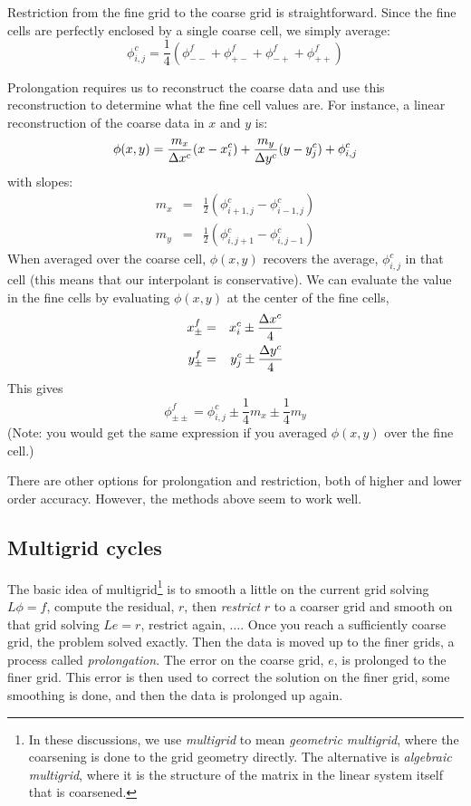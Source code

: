 Restriction from the fine grid to the coarse grid is straightforward.
Since the fine cells are perfectly enclosed by a single coarse cell,
we simply average:
\begin{equation}
\phi_{i,j}^c = \frac{1}{4} ( \phi_{--}^f + \phi_{+-}^f +
                             \phi_{-+}^f + \phi_{++}^f )
\end{equation}

Prolongation requires us to reconstruct the coarse data and use
this reconstruction to determine what the fine cell values are.  For
instance, a linear reconstruction of the coarse data in $x$ and $y$ is:
\begin{equation}
\phi(x,y) = \frac{m_x}{\Delta x^c} (x - x_i^c) + 
            \frac{m_y}{\Delta y^c} (y - y_j^c) + \phi_{i,j}^c
\end{equation}
with slopes:
\begin{eqnarray}
m_x &=& \frac{1}{2}({\phi_{i+1,j}^c - \phi_{i-1,j}^c}) \\
m_y &=& \frac{1}{2}({\phi_{i,j+1}^c - \phi_{i,j-1}^c})
\end{eqnarray}
%
When averaged over the coarse cell, $\phi(x,y)$ recovers the average,
$\phi_{i,j}^c$ in that cell (this means that our interpolant is
conservative).  We can evaluate the value in the fine cells by
evaluating $\phi(x,y)$ at the center of the fine cells,
\begin{eqnarray}
x_\pm^f &=& x_i^c \pm \frac{\Delta x^c}{4} \\
y_\pm^f &=& y_j^c \pm \frac{\Delta y^c}{4} \\
\end{eqnarray}
This gives
\begin{equation}
\phi_{\pm\pm}^f = \phi_{i,j}^c \pm \frac{1}{4}m_x \pm \frac{1}{4}m_y
\end{equation}
(Note: you would get the same expression if you averaged $\phi(x,y)$ over
the fine cell.)

There are other options for prolongation and restriction, both of
higher and lower order accuracy.  However, the methods above seem to
work well.


\subsection{Multigrid cycles}

The basic idea of
multigrid\footnote{ In these discussions, we use {\em multigrid} to
  mean {\em geometric multigrid}, where the coarsening is done to the
  grid geometry directly.  The alternative is {\em algebraic
    multigrid}, where it is the structure of the matrix in the linear
  system itself that is coarsened.}  is to smooth a little on the
current grid solving $L\phi = f$, compute the residual, $r$, then {\em
  restrict} $r$ to a coarser grid and smooth on that grid solving $Le
= r$, restrict again, $\ldots$.  Once you reach a sufficiently coarse
grid, the problem solved exactly.  Then the data is moved up to the
finer grids, a process called {\em prolongation}.  The error on the
coarse grid, $e$, is prolonged to the finer grid.  This error is then
used to correct the solution on the finer grid, some smoothing is
done, and then the data is prolonged up again.

